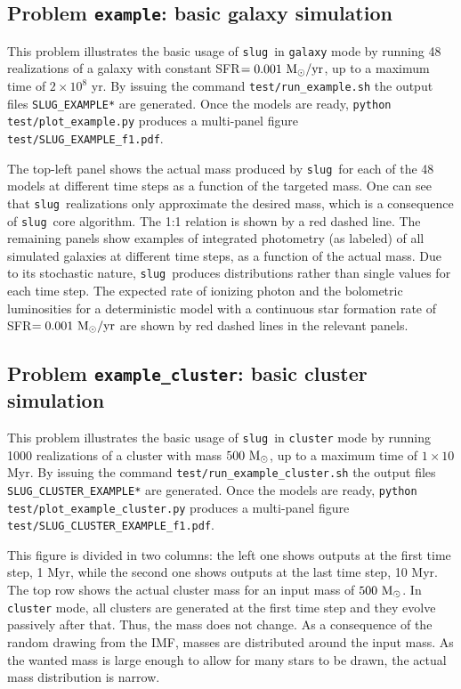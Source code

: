 \documentclass[12pt]{article}
\newcommand{\slug}{\texttt{slug}}
\begin{document}
\subsection{Problem {\tt example}: basic galaxy simulation}

This problem illustrates the basic usage of \slug\ in \verb=galaxy= mode
by running 48 realizations of a galaxy with constant SFR$=0.001~\rm M_\odot/yr$,
up to a maximum time of $2\times 10^8$ yr. 
By issuing the command \verb=test/run_example.sh= the output files \verb=SLUG_EXAMPLE*= are 
generated. Once the models are ready, \verb=python test/plot_example.py= produces 
a multi-panel figure \verb=test/SLUG_EXAMPLE_f1.pdf=. 

The top-left panel shows the actual mass produced by \slug\ for each of the 48 models 
at different time steps as a function of the targeted mass. One can see that 
\slug\ realizations only approximate the desired mass, which is a consequence 
of \slug\ core algorithm. The 1:1 relation is shown by a red dashed line. 
The remaining panels show examples of integrated photometry (as labeled) of all simulated galaxies 
at different time steps, as a function of the actual mass. Due to its stochastic nature, \slug\ produces 
distributions rather than single values for each time step. The expected rate of ionizing 
photon and the bolometric luminosities for a deterministic model with a
continuous star formation rate of  SFR$=0.001~\rm M_\odot/yr$ are shown 
by red dashed lines in the relevant panels. 


\subsection{Problem {\tt example\_cluster}: basic cluster simulation}

This problem illustrates the basic usage of \slug\ in \verb=cluster= mode 
by running 1000 realizations of a cluster with mass $500~\rm M_\odot$,
up to a maximum time of $1\times 10$ Myr. By issuing the command 
\verb=test/run_example_cluster.sh= the output files \verb=SLUG_CLUSTER_EXAMPLE*= are 
generated. Once the models are ready, \verb=python test/plot_example_cluster.py= produces 
a multi-panel figure \verb=test/SLUG_CLUSTER_EXAMPLE_f1.pdf=. 

This figure is divided in two columns: the left one shows outputs at the first time step, 1 Myr,
while the second one shows outputs at the last time step, 10 Myr. 
The top row shows the actual cluster mass for an input mass of $500~\rm M_\odot$.
In \verb=cluster= mode, all clusters are generated at the first time step and they evolve 
passively after that. Thus, the mass does not change. As a consequence of the 
random drawing from the IMF, masses are distributed around the input mass. 
As the wanted mass is large enough to allow for many stars to be drawn, the 
actual mass distribution is narrow. 
\end{document}
